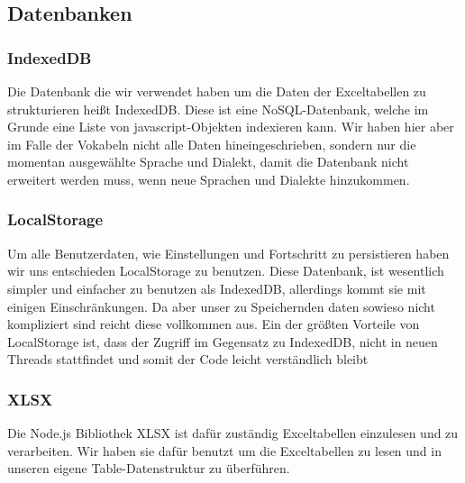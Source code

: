 \subsection{Datenbanken}
\subsubsection*{IndexedDB}
Die Datenbank die wir verwendet haben um die Daten der Exceltabellen zu strukturieren heißt IndexedDB. Diese ist eine NoSQL-Datenbank, welche im Grunde eine Liste von javascript-Objekten indexieren kann. Wir haben hier aber im Falle der Vokabeln nicht alle Daten hineingeschrieben, sondern nur die momentan ausgewählte Sprache und Dialekt, damit die Datenbank nicht erweitert werden muss, wenn neue Sprachen und Dialekte hinzukommen.

\subsubsection*{LocalStorage}
Um alle Benutzerdaten, wie Einstellungen und Fortschritt zu persistieren haben wir uns entschieden LocalStorage zu benutzen. Diese Datenbank, ist wesentlich simpler und einfacher zu benutzen als IndexedDB, allerdings kommt sie mit einigen Einschränkungen. Da aber unser zu Speichernden daten sowieso nicht kompliziert sind reicht diese vollkommen aus. Ein der größten Vorteile von LocalStorage ist, dass der Zugriff im Gegensatz zu IndexedDB, nicht in neuen Threads stattfindet und somit der Code leicht verständlich bleibt

\subsubsection*{XLSX} 
Die Node.js Bibliothek XLSX ist dafür zuständig Exceltabellen einzulesen und zu verarbeiten. Wir haben sie dafür benutzt um die Exceltabellen zu lesen und in unseren eigene Table-Datenstruktur zu überführen.